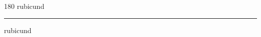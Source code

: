 
\begin{frame}
\begin{center}
\begin{turn}{180}
{\fontsize{2.5cm}{1em}\selectfont rubicund}
\end{turn}
\vspace{1em}\par  
\hrule
\vspace{1em}\par  
{\fontsize{2.5cm}{1em}\selectfont rubicund}
\end{center}
\end{frame}
